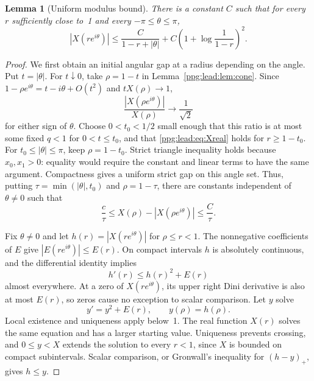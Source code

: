 \documentclass[11pt,letterpaper]{article}
\newtheorem{lemma}[theorem]{Lemma}
\theoremstyle{remark}\newtheorem{remark}[theorem]{Remark}
\numberwithin{equation}{section}
\begin{document}
\begin{lemma}[Uniform modulus bound]\label{ppg:lead:lem:modulus}
There is a constant $C$ such that for every $r$ sufficiently close to~1 and every $-\pi\le\theta\le\pi$,
\begin{equation}\label{ppg:lead:eq:modulus}
 |X(re^{i\theta})|\le\frac C{1-r+|\theta|}
       +C\left(1+\log\frac1{1-r}\right)^2.
\end{equation}
\end{lemma}
\begin{proof}
We first obtain an initial angular gap at a radius depending on the angle. Put $t=|\theta|$. For $t\downarrow0$, take $\rho=1-t$ in Lemma~\ref{ppg:lead:lem:cone}. Since
$1-\rho e^{i\theta}=t-i\theta+O(t^2)$ and $tX(\rho)\to1$,
\[
 \frac{|X(\rho e^{i\theta})|}{X(\rho)}\longrightarrow\frac1{\sqrt2}
\]
for either sign of $\theta$. Choose $0<t_0<1/2$ small enough that this ratio is at most some fixed $q<1$ for $0<t\le t_0$, and that \eqref{ppg:lead:eq:Xreal} holds for $r\ge1-t_0$. For $t_0\le|\theta|\le\pi$, keep $\rho=1-t_0$. Strict triangle inequality holds because $x_0,x_1>0$: equality would require the constant and linear terms to have the same argument. Compactness gives a uniform strict gap on this angle set. Thus, putting $\tau=\min(|\theta|,t_0)$ and $\rho=1-\tau$, there are constants independent of $\theta\ne0$ such that
\begin{equation}\label{ppg:lead:eq:initialgap}
 \frac c\tau\le X(\rho)-|X(\rho e^{i\theta})|\le\frac C\tau.
\end{equation}

Fix $\theta\ne0$ and let $h(r)=|X(re^{i\theta})|$ for $\rho\le r<1$. The nonnegative coefficients of $E$ give
$|E(re^{i\theta})|\le E(r)$. On compact intervals $h$ is absolutely continuous, and the differential identity implies
\[
 h'(r)\le h(r)^2+E(r)
\]
almost everywhere. At a zero of $X(re^{i\theta})$, its upper right Dini derivative is also at most $E(r)$, so zeros cause no exception to scalar comparison. Let $y$ solve
\[
 y'=y^2+E(r),\qquad y(\rho)=h(\rho).
\]
Local existence and uniqueness apply below~1. The real function $X(r)$ solves the same equation and has a larger starting value. Uniqueness prevents crossing, and $0\le y<X$ extends the solution to every $r<1$, since $X$ is bounded on compact subintervals. Scalar comparison, or Gronwall's inequality for $(h-y)_+$, gives $h\le y$.


\end{proof}
\end{document}
